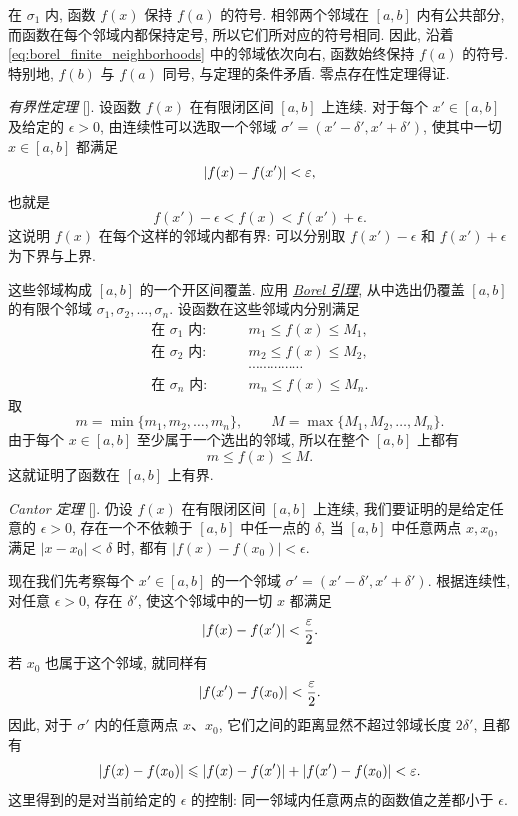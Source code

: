 在 $\sigma_1$ 内, 函数 $f(x)$ 保持 $f(a)$ 的符号.
相邻两个邻域在 $[a,b]$ 内有公共部分,
而函数在每个邻域内都保持定号, 所以它们所对应的符号相同.
因此, 沿着 \eqref{eq:borel_finite_neighborhoods} 中的邻域依次向右,
函数始终保持 $f(a)$ 的符号.
特别地, $f(b)$ 与 $f(a)$ 同号, 与定理的条件矛盾.
零点存在性定理得证.

\myrefparagraph{2\textdegree}\label{proof:borel_boundedness}
\emph{有界性定理} [].
设函数 $f(x)$ 在有限闭区间 $[a,b]$ 上连续.
对于每个 $x'\in[a,b]$ 及给定的 $\epsilon>0$,
由连续性可以选取一个邻域 $\sigma'=(x'-\delta',x'+\delta')$,
使其中一切 $x\in[a,b]$ 都满足
$$
\left| f(x)-f(x') \right|<\varepsilon,
$$
也就是
$$
f(x')-\epsilon<f(x)<f(x')+\epsilon.
$$
这说明 $f(x)$ 在每个这样的邻域内都有界:
可以分别取 $f(x')-\epsilon$ 和 $f(x')+\epsilon$ 为下界与上界.

这些邻域构成 $[a,b]$ 的一个开区间覆盖.
应用 \hyperref[lem:borel_finite_cover]{\emph{Borel 引理}}, 从中选出仍覆盖 $[a,b]$ 的有限个邻域
$\sigma_1,\sigma_2,\ldots,\sigma_n$.
设函数在这些邻域内分别满足
$$
\begin{aligned}
\text{在 }\sigma_1\text{ 内}:&\qquad m_1\leq f(x)\leq M_1,\\
\text{在 }\sigma_2\text{ 内}:&\qquad m_2\leq f(x)\leq M_2,\\
&\qquad\cdots\cdots\cdots\cdots\cdots\\
\text{在 }\sigma_n\text{ 内}:&\qquad m_n\leq f(x)\leq M_n.
\end{aligned}
$$
取
$$
m=\min\{m_1,m_2,\ldots,m_n\},\qquad
M=\max\{M_1,M_2,\ldots,M_n\}.
$$
由于每个 $x\in[a,b]$ 至少属于一个选出的邻域, 所以在整个 $[a,b]$ 上都有
$$
m\leq f(x)\leq M.
$$
这就证明了函数在 $[a,b]$ 上有界.

\myrefparagraph{3\textdegree}\label{proof:borel_uniform_continuity}
\emph{Cantor 定理} [].
仍设 $f(x)$ 在有限闭区间 $[a,b]$ 上连续, 我们要证明的是给定任意的 $\epsilon>0$,
存在一个不依赖于 $[a,b]$ 中任一点的 $\delta$, 当 $[a,b]$ 中任意两点 $x,x_0$, 满足
$|x-x_0|<\delta$ 时, 都有 $|f(x)-f(x_0)|<\epsilon$.

现在我们先考察每个 $x'\in[a,b]$ 的一个邻域 $\sigma'=(x'-\delta',x'+\delta')$.
根据连续性, 对任意 $\epsilon > 0$, 存在 $\delta'$, 使这个邻域中的一切 $x$ 都满足
$$
\left| f(x)-f(x') \right|<\frac{\varepsilon}2.
$$
若 $x_0$ 也属于这个邻域, 就同样有
$$
\left| f(x')-f(x_0) \right|<\frac{\varepsilon}2.
$$
因此, 对于 $\sigma'$ 内的任意两点 $x$、$x_0$, 它们之间的距离显然不超过邻域长度 $2\delta'$, 且都有
$$
\left| f(x)-f(x_0) \right|
\leqslant\left| f(x)-f(x') \right|+\left| f(x')-f(x_0) \right|<\varepsilon.
$$
这里得到的是对当前给定的 $\epsilon$ 的控制:
同一邻域内任意两点的函数值之差都小于 $\epsilon$.

